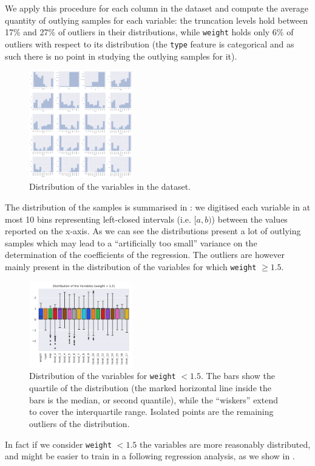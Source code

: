 We apply this procedure for each column in the dataset and compute the average
quantity of outlying samples for each variable: the truncation levels hold
between 17\% and 27\% of outliers in their distributions, while \texttt{weight}
holds only 6\% of outliers with respect to its distribution (the \texttt{type}
feature is categorical and as such there is no point in studying the outlying
samples for it).
\begin{figure}[htbp]
  \centering
  \includegraphics[width=0.4\textwidth]{img/dataset-distribution_full}
  \caption{Distribution of the variables in the dataset.}
  \label{fig:eda:distr_full}
\end{figure}
The distribution of the samples is summarised in : we
digitised each variable in at most 10 bins representing left-closed intervals
(i.e. $[a, b)$) between the values reported on the x-axis.
As we can see the distributions present a lot of outlying samples which may
lead to a ``artificially too small'' variance on the determination of the
coefficients of the regression.
The outliers are however mainly present in the distribution of the variables for which \texttt{weight} $\ge 1.5$.
\begin{figure}[htbp]
  \centering
  \includegraphics[width=0.4\textwidth]{img/dataset-distribution_box_low}
  \caption{Distribution of the variables for \texttt{weight} $< 1.5$. The bars
  show the quartile of the distribution (the marked horizontal line inside the
  bars is the median, or second quantile), while the ``wiskers'' extend to
  cover the interquartile range. Isolated points are the remaining outliers of
  the distribution.}
  \label{fig:eda:low_weight}
\end{figure}
In fact if we consider \texttt{weight} $< 1.5$ the variables are more
reasonably distributed, and might be easier to train in a following regression
analysis, as we show in .

